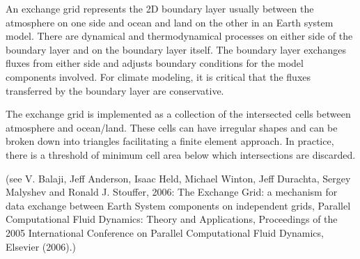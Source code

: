 
An exchange grid represents the 2D boundary layer usually between the
atmosphere on one side and ocean and land on the other in an Earth
system model. There are dynamical and thermodynamical processes on
either side of the boundary layer and on the boundary layer itself.
The boundary layer exchanges fluxes from either side and adjusts
boundary conditions for the model components involved. For climate modeling,
it is critical that the fluxes transferred by the boundary layer are
conservative.

The exchange grid is implemented as a collection of the intersected cells
between atmosphere and ocean/land. These cells can have irregular shapes
and can be broken down into triangles facilitating a finite element
approach. In practice, there is a threshold of minimum cell area below
which intersections are discarded.

(see V. Balaji, Jeff Anderson, Isaac Held, Michael Winton, Jeff Durachta,
Sergey Malyshev and Ronald J. Stouffer, 2006:  The Exchange Grid: a
mechanism for data exchange between Earth System components on independent
grids, Parallel Computational Fluid Dynamics: Theory and Applications,
Proceedings of the 2005 International Conference on Parallel Computational
Fluid Dynamics, Elsevier (2006).) 
